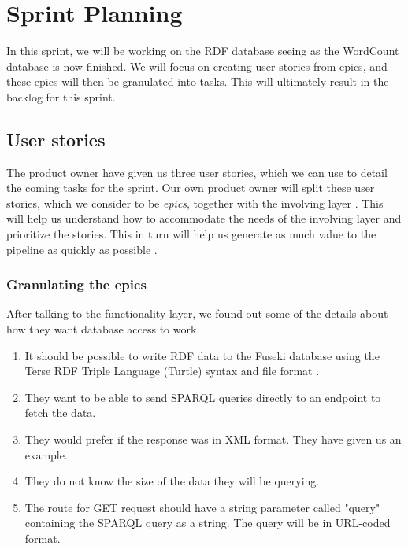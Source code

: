 \section{Sprint Planning}
In this sprint, we will be working on the RDF database seeing as the WordCount database is now finished.
We will focus on creating user stories from epics, and these epics will then be granulated into tasks.
This will ultimately result in the backlog for this sprint.

\subsection*{User stories}
The \knox{} product owner have given us three user stories, which we can use to detail the coming tasks for the sprint.
Our own product owner will split these user stories, which we consider to be \textit{epics}, together with the involving layer \cite{Epics}.
This will help us understand how to accommodate the needs of the involving layer and prioritize the stories.
This in turn will help us generate as much value to the pipeline as quickly as possible \cite{UserStories}.


\subsubsection*{Granulating the epics}
After talking to the functionality layer, we found out some of the details about how they want database access to work. 

\begin{enumerate}
    \item It should be possible to write RDF data to the Fuseki database using the Terse RDF Triple Language (Turtle) syntax and file format \cite{TurtleFormat}.
    \item They want to be able to send SPARQL queries directly to an endpoint to fetch the data.
    \item They would prefer if the response was in XML format. They have given us an example.
    \item They do not know the size of the data they will be querying.
    \item The route for GET request should have a string parameter called "query" containing the SPARQL query as a string.
    The query will be in URL-coded format.
\end{enumerate}

